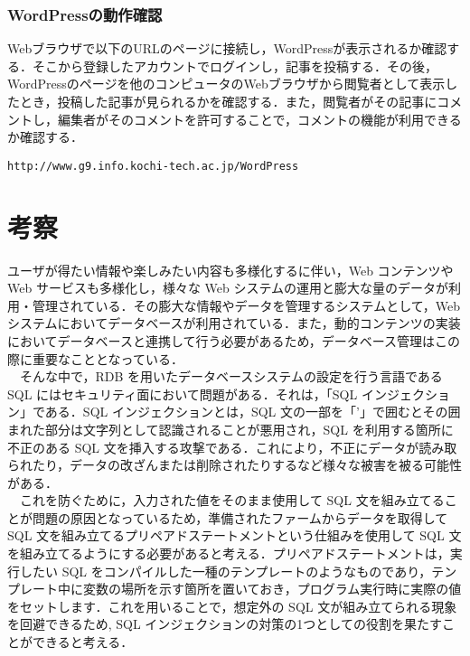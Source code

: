 \documentclass[a4j,titlepage]{jarticle}
\begin{document}
\begin{itemize}
\begin{enumerate}
\subsubsection{WordPressの動作確認}
Webブラウザで以下のURLのページに接続し，WordPressが表示されるか確認する．そこから登録したアカウントでログインし，記事を投稿する．その後，WordPressのページを他のコンピュータのWebブラウザから閲覧者として表示したとき，投稿した記事が見られるかを確認する．また，閲覧者がその記事にコメントし，編集者がそのコメントを許可することで，コメントの機能が利用できるか確認する．
\begin{screen}
\begin{center}
\begin{verbatim}
http://www.g9.info.kochi-tech.ac.jp/WordPress
\end{verbatim}
\end{center}
\end{screen}


%
\section{考察}
ユーザが得たい情報や楽しみたい内容も多様化するに伴い，Web コンテンツや Web サービスも多様化し，様々な Web システムの運用と膨大な量のデータが利用・管理されている．その膨大な情報やデータを管理するシステムとして，Web システムにおいてデータベースが利用されている．また，動的コンテンツの実装においてデータベースと連携して行う必要があるため，データベース管理はこの際に重要なこととなっている．\\
　そんな中で，RDB を用いたデータベースシステムの設定を行う言語である SQL にはセキュリティ面において問題がある．それは，「SQL インジェクション」である．SQL インジェクションとは，SQL 文の一部を「'」で囲むとその囲まれた部分は文字列として認識されることが悪用され，SQL を利用する箇所に不正のある SQL 文を挿入する攻撃である．これにより，不正にデータが読み取られたり，データの改ざんまたは削除されたりするなど様々な被害を被る可能性がある．\\
　これを防ぐために，入力された値をそのまま使用して SQL 文を組み立てることが問題の原因となっているため，準備されたファームからデータを取得して SQL 文を組み立てるプリペアドステートメントという仕組みを使用して SQL 文を組み立てるようにする必要があると考える．プリペアドステートメントは，実行したい SQL をコンパイルした一種のテンプレートのようなものであり，テンプレート中に変数の場所を示す箇所を置いておき，プログラム実行時に実際の値をセットします．これを用いることで，想定外の SQL 文が組み立てられる現象を回避できるため, SQL インジェクションの対策の1つとしての役割を果たすことができると考える．



\end{enumerate}
\end{itemize}
\end{document}

